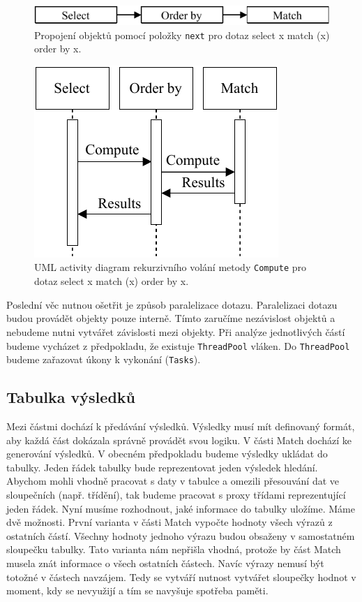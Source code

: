 \clearpage

\begin{figure}[!htp]
\includegraphics{../img/diaQueryObjectsCon.pdf}\centering
\caption{Propojení objektů pomocí položky \texttt{next} pro dotaz select x match (x) order by x.}
\label{figure.diaQueryObjectsCon}
\end{figure}

\begin{figure}[!htp]
\includegraphics{../img/diaQueryObjectsCall.pdf}\centering
\caption{UML activity diagram rekurzivního volání metody \texttt{Compute} pro dotaz select x match (x) order by x.}
\label{figure.diaQueryObjectsCall}
\end{figure}

Poslední věc nutnou ošetřit je způsob paralelizace dotazu.
Paralelizaci dotazu budou provádět objekty pouze interně.
Tímto zaručíme nezávislost objektů a nebudeme nutni vytvářet závislosti mezi objekty.
Při analýze jednotlivých částí budeme vycházet z předpokladu, že existuje \texttt{ThreadPool} vláken.
Do \texttt{ThreadPool} budeme zařazovat úkony k vykonání (\texttt{Tasks}).

\subsection{Tabulka výsledků} \label{anal.tables}

Mezi částmi dochází k předávání výsledků.
Výsledky musí mít definovaný formát, aby každá část dokázala správně provádět svou logiku.
V části Match dochází ke generování výsledků.
V obecném předpokladu budeme výsledky ukládat do tabulky.
Jeden řádek tabulky bude reprezentovat jeden výsledek hledání.
Abychom mohli vhodně pracovat s daty v tabulce a omezili přesouvání dat ve sloupečních (např. třídění), tak budeme pracovat s proxy třídami reprezentující jeden řádek.
Nyní musíme rozhodnout, jaké informace do tabulky uložíme.
Máme dvě možnosti.
První varianta v části Match vypočte hodnoty všech výrazů z ostatních částí.
Všechny hodnoty jednoho výrazu budou obsaženy v samostatném sloupečku tabulky.
Tato varianta nám nepřišla vhodná, protože by část Match musela znát informace o všech ostatních částech.
Navíc výrazy nemusí být totožné v částech navzájem.
Tedy se vytváří nutnost vytvářet sloupečky hodnot v moment, kdy se nevyužijí a tím se navyšuje spotřeba paměti.

